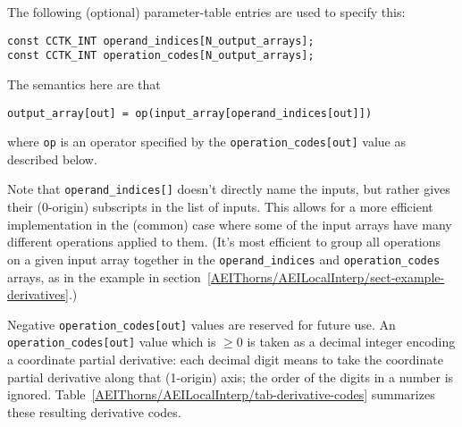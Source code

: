 The following (optional) parameter-table entries are used to specify
this:
\begin{verbatim}
const CCTK_INT operand_indices[N_output_arrays];
const CCTK_INT operation_codes[N_output_arrays];
\end{verbatim}
The semantics here are that
\begin{verbatim}
output_array[out] = op(input_array[operand_indices[out]])
\end{verbatim}
where \verb|op| is an operator specified by the \verb|operation_codes[out]|
value as described below.

Note that \verb|operand_indices[]| doesn't directly name the inputs,
but rather gives their (0-origin) subscripts in the list of inputs.
This allows for a more efficient implementation in the (common) case
where some of the input arrays have many different operations applied
to them.  (It's most efficient to group all operations on a given
input array together in the \verb|operand_indices| and
\verb|operation_codes| arrays, as in the example in
section~\ref{AEIThorns/AEILocalInterp/sect-example-derivatives}.)

Negative \verb|operation_codes[out]| values  are reserved for future
use.  An \verb|operation_codes[out]| value which is $\ge 0$ is taken
as a decimal integer encoding a coordinate partial derivative: each
decimal digit means to take the coordinate partial derivative along
that (1-origin) axis; the order of the digits in a number is ignored.
Table~\ref{AEIThorns/AEILocalInterp/tab-derivative-codes} summarizes these resulting
derivative codes.


